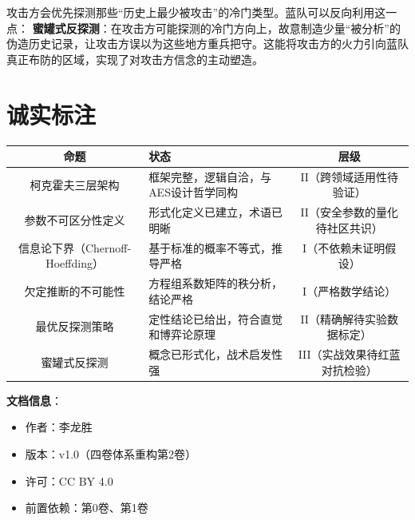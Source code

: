 \documentclass[11pt,a4paper]{article}
\begin{document}
攻击方会优先探测那些“历史上最少被攻击”的冷门类型。蓝队可以反向利用这一点：
\textbf{蜜罐式反探测}：在攻击方可能探测的冷门方向上，故意制造少量“被分析”的伪造历史记录，让攻击方误以为这些地方重兵把守。这能将攻击方的火力引向蓝队真正布防的区域，实现了对攻击方信念的主动塑造。

\section{诚实标注}

\begin{center}
\begin{xltabular}{\textwidth}{c|X|c}
\toprule
\textbf{命题} & \textbf{状态} & \textbf{层级} \\
\midrule
柯克霍夫三层架构 & 框架完整，逻辑自洽，与AES设计哲学同构 & II（跨领域适用性待验证） \\
参数不可区分性定义 & 形式化定义已建立，术语已明晰 & II（安全参数的量化待社区共识） \\
信息论下界（Chernoff-Hoeffding） & 基于标准的概率不等式，推导严格 & I（不依赖未证明假设） \\
欠定推断的不可能性 & 方程组系数矩阵的秩分析，结论严格 & I（严格数学结论） \\
最优反探测策略 & 定性结论已给出，符合直觉和博弈论原理 & II（精确解待实验数据标定） \\
蜜罐式反探测 & 概念已形式化，战术启发性强 & III（实战效果待红蓝对抗检验） \\
\bottomrule
\end{xltabular}
\end{center}

\vspace{5mm}
\noindent\textbf{文档信息}：
\begin{itemize}
    \item 作者：李龙胜
    \item 版本：v1.0（四卷体系重构第2卷）
    \item 许可：CC BY 4.0
    \item 前置依赖：第0卷、第1卷
\end{itemize}
\end{document}
